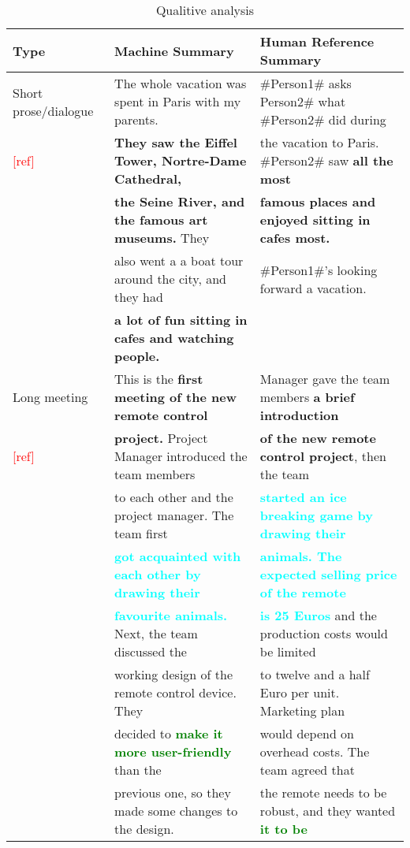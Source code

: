 \begin{table*}[h]
	\caption{Qualitive analysis}
	\label{tab:matrix}
	\begin{center}
				\begin{tabular}{l|l|l}
							\hline
							Type & Machine Summary & Human Reference Summary    \\
							\hline
						Short prose/dialogue & The whole vacation was spent in Paris with my parents. &  \#Person1\# asks Person2\# what \#Person2\# did during  \\
						\textcolor{red}{[ref]}  & 	\textbf{They saw the Eiffel Tower, Nortre-Dame Cathedral, }   & the vacation to Paris.  \#Person2\# saw \textbf{all the most} \\
						&	\textbf{the Seine River, and the famous art museums.} They & \textbf{famous places and enjoyed sitting in cafes most.}  \\
						&	also went a a boat tour around the city, and they had & \#Person1\#'s looking forward a vacation. \\
						&\textbf{a lot of fun sitting in cafes and watching people.}  & \\
							\hline
					Long meeting & This is the \textbf{first meeting of the new remote control}& Manager gave the team members \textbf{a brief introduction} \\
					 \textcolor{red}{[ref]}    & \textbf{project.} Project Manager introduced the team members & \textbf{of the new remote control project}, then the team \\\
					 & to each other and the project manager. The team first  & \textbf{\textcolor{cyan}{started an ice breaking game by drawing their }}  \\
					 & \textbf{\textcolor{cyan}{got acquainted with each other by drawing their}} & \textbf{\textcolor{cyan}{animals. The expected selling price of the remote}} \\
					 & \textbf{\textcolor{cyan}{favourite animals.}} Next, the team discussed the &  \textbf{\textcolor{cyan}{is 25 Euros}} and the production costs would be limited \\
					 & working design of the remote control device. They & to twelve and a half Euro per unit. Marketing plan \\
					 & decided to \textbf{\textcolor{green}{make it more user-friendly}} than the  & would depend on overhead costs. The team agreed that \\
					 & previous one, so they made some changes to the design. & the remote needs to be robust, and they wanted \textbf{\textcolor{green}{it to be}} \\

\end{tabular}
\end{center}
\end{table*}
